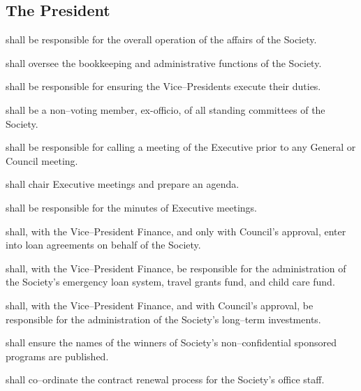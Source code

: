 \subsection {The President}
\begin{longenum}[ label*=\thesubsection.\arabic*., align=left]
	\item shall be responsible for the overall operation of the affairs of the Society.
    \item shall oversee the bookkeeping and administrative functions of the Society. 
    \item shall be responsible for ensuring the Vice--Presidents execute their duties. 
    \item shall be a non--voting member, ex-officio, of all standing committees of the Society.
    \item shall be responsible for calling a meeting of the Executive prior to any General or Council meeting.
    \item shall chair Executive meetings and prepare an agenda.
    \item shall be responsible for the minutes of Executive meetings. 
    \item shall, with the Vice--President Finance, and only with Council's approval, enter into loan agreements on behalf of the Society.
    \item shall, with the Vice--President Finance, be responsible for the administration of the Society's emergency loan system, travel grants fund, and child care fund. 
    \item shall, with the Vice--President Finance, and with Council's approval, be responsible for the administration of the Society's long--term investments. 
    \item shall ensure the names of the winners of Society's non--confidential sponsored programs are published.
    \item shall co--ordinate the contract renewal process for the Society's office staff. 

\end{longenum}
